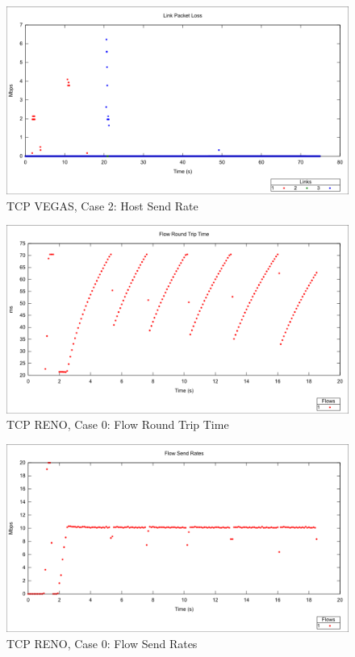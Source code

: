\begin{figure}[htbp]
    \centering
    \includegraphics[width=\textwidth]{vegas2/Link_Packet_Loss.png}
    \caption{TCP VEGAS, Case 2: Host Send Rate}
\end{figure}

\newpage
\clearpage


\begin{figure}[htbp]
    \centering
    \includegraphics[width=\textwidth]{reno0/Flow_RTT.png}
    \caption{TCP RENO, Case 0: Flow Round Trip Time}
\end{figure}

\begin{figure}[htbp]
    \centering
    \includegraphics[width=\textwidth]{reno0/Flow_Send_Rates.png}
    \caption{TCP RENO, Case 0: Flow Send Rates}
\end{figure}

